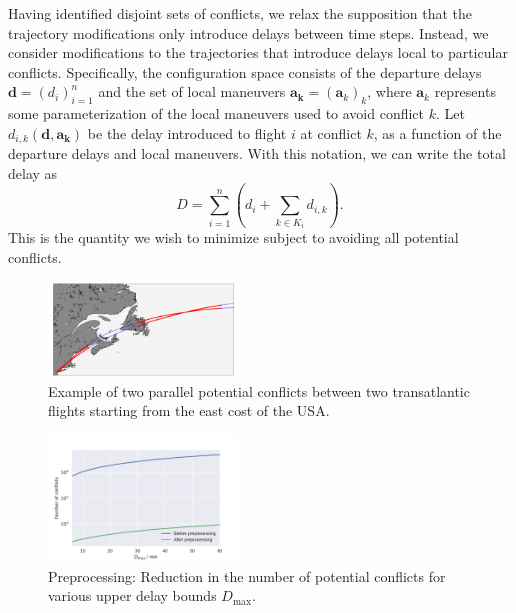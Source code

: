 Having identified disjoint sets of conflicts, we relax the supposition that the trajectory modifications only introduce delays between time steps.
Instead, we consider modifications to the trajectories that introduce delays local to particular conflicts.
Specifically, the configuration space consists of the departure delays $\mathbf d = {\left(d_i\right)}_{i=1}^n$ and the set of local maneuvers $\mathbf a_{\mathbf k} = {\left(\mathbf a_k\right)}_k$, where $\mathbf a_k$ represents some parameterization of the local maneuvers used to avoid conflict $k$.
Let $d_{i, k} (\mathbf d, \mathbf a_{\mathbf k})$ be the delay introduced to flight $i$ at conflict $k$, as a function of the departure delays and local maneuvers.
With this notation, we can write the total delay as
\begin{equation}
D = 
\sum_{i = 1}^{n}
\left(d_i + \sum_{k \in K_i} d_{i, k}\right).
\end{equation}
This is the quantity we wish to minimize subject to avoiding all potential conflicts.
\begin{figure}[t]
    \begin{center}
        \includegraphics[width=0.45\textwidth]{./pics/example_conflict_in_real_space.pdf}
    \end{center}
\caption{Example of two parallel potential conflicts between two transatlantic flights starting from the east cost of the USA.}
\label{fig:example_parallel_conflict}
\end{figure}

\begin{figure}[t]
    \begin{center}
        \includegraphics[width=0.45\textwidth]{./pics/preprocessing_reduction_number_of_conflicts.pdf}
    \end{center}
    \caption{Preprocessing: Reduction in the number of potential conflicts for various upper delay bounds $D_\text{max}$.}
\label{fig:preprocessing_reduction_number_of_conflicts}
\end{figure}

